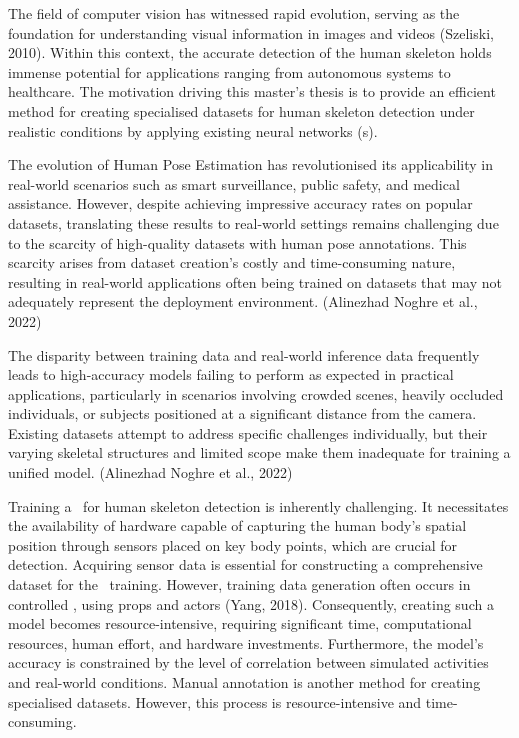 

The field of computer vision has witnessed rapid evolution, serving as the foundation for understanding visual information in images and videos (\scc Szeliski, 2010). Within this context, the accurate detection of the human skeleton holds immense potential for applications ranging from autonomous systems to healthcare. The motivation driving this master's thesis is to provide an efficient method for creating specialised datasets for human skeleton detection under realistic conditions by applying existing neural networks (\NN\-s).

The evolution of Human Pose Estimation has revolutionised its applicability in real-world scenarios such as smart surveillance, public safety, and medical assistance. However, despite achieving impressive accuracy rates on popular datasets, translating these results to real-world settings remains challenging due to the scarcity of high-quality datasets with human pose annotations. This scarcity arises from dataset creation's costly and time-consuming nature, resulting in real-world applications often being trained on datasets that may not adequately represent the deployment environment. (\scc Alinezhad Noghre et al., 2022)

The disparity between training data and real-world inference data frequently leads to high-accuracy models failing to perform as expected in practical applications, particularly in scenarios involving crowded scenes, heavily occluded individuals, or subjects positioned at a significant distance from the camera. Existing datasets attempt to address specific challenges individually, but their varying skeletal structures and limited scope make them inadequate for training a unified model. (\scc Alinezhad Noghre et al., 2022)

Training a \NN\ for human skeleton detection is inherently challenging. It necessitates the availability of hardware capable of capturing the human body's spatial position through sensors placed on key body points, which are crucial for detection. Acquiring sensor data is essential for constructing a comprehensive dataset for the \NN\ training. However, training data generation often occurs in controlled , using props and actors (\scc Yang, 2018). Consequently, creating such a model becomes resource-intensive, requiring significant time, computational resources, human effort, and hardware investments.
Furthermore, the model's accuracy is constrained by the level of correlation between simulated activities and real-world conditions. Manual annotation is another method for creating specialised datasets. However, this process is resource-intensive and time-consuming.

